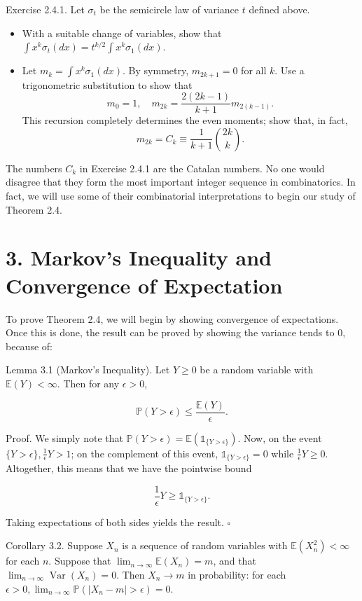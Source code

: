 \documentclass[10pt]{article}
\begin{document}
Exercise 2.4.1. Let $\sigma_{t}$ be the semicircle law of variance $t$ defined above.

\begin{itemize}
  \item[(a)] With a suitable change of variables, show that $\int x^{k} \sigma_{t}(d x)=t^{k / 2} \int x^{k} \sigma_{1}(d x)$.
  \item[(b)] Let $m_{k}=\int x^{k} \sigma_{1}(d x)$. By symmetry, $m_{2 k+1}=0$ for all $k$. Use a trigonometric substitution to show that
$$
m_{0}=1, \quad m_{2 k}=\frac{2(2 k-1)}{k+1} m_{2(k-1)} .
$$
This recursion completely determines the even moments; show that, in fact,
$$
m_{2 k}=C_{k} \equiv \frac{1}{k+1}\binom{2 k}{k} .
$$
\end{itemize}

The numbers $C_{k}$ in Exercise 2.4.1 are the Catalan numbers. No one would disagree that they form the most important integer sequence in combinatorics. In fact, we will use some of their combinatorial interpretations to begin our study of Theorem 2.4.

\section*{3. Markov's Inequality and Convergence of Expectation}
To prove Theorem 2.4, we will begin by showing convergence of expectations. Once this is done, the result can be proved by showing the variance tends to 0, because of:

Lemma 3.1 (Markov's Inequality). Let $Y \geq 0$ be a random variable with $\mathbb{E}(Y)<\infty$. Then for any $\epsilon>0$,

$$
\mathbb{P}(Y>\epsilon) \leq \frac{\mathbb{E}(Y)}{\epsilon} .
$$

Proof. We simply note that $\mathbb{P}(Y>\epsilon)=\mathbb{E}\left(\mathbb{1}_{\{Y>\epsilon\}}\right)$. Now, on the event $\{Y>\epsilon\}, \frac{1}{\epsilon} Y>1$; on the complement of this event, $\mathbb{1}_{\{Y>\epsilon\}}=0$ while $\frac{1}{\epsilon} Y \geq 0$. Altogether, this means that we have the pointwise bound

$$
\frac{1}{\epsilon} Y \geq \mathbb{1}_{\{Y>\epsilon\}} .
$$

Taking expectations of both sides yields the result. \(\square\)

Corollary 3.2. Suppose $X_{n}$ is a sequence of random variables with $\mathbb{E}\left(X_{n}^{2}\right)<\infty$ for each $n$. Suppose that $\lim _{n \rightarrow \infty} \mathbb{E}\left(X_{n}\right)=m$, and that $\lim _{n \rightarrow \infty} \operatorname{Var}\left(X_{n}\right)=0$. Then $X_{n} \rightarrow m$ in probability: for each $\epsilon>0, \lim _{n \rightarrow \infty} \mathbb{P}\left(\left|X_{n}-m\right|>\epsilon\right)=0$.
\end{document}
